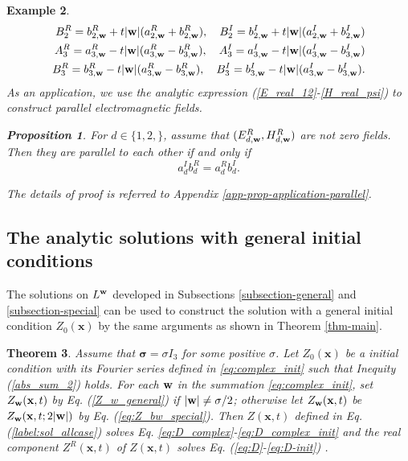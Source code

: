 \documentclass[10pt,reqno]{amsart}
\newcommand{\bS}{\boldsymbol{\sigma}}
\renewcommand{\(}{\left(}
\renewcommand{\)}{\right)}
\newcommand{\bw}{{\bf w}}
\newcommand{\bx}{\mathbf{x}}
\newtheorem{theo}{Theorem}[section]
\newtheorem{prop}[theo]{Proposition}
\newtheorem{ex}[theo]{Example}
\numberwithin{equation}{section}
\begin{document}
\begin{ex}
\begin{eqnarray*}
	B^R_{2} = b^R_{2,\bw} + t|\bw|(a^R_{2,\bw} + b^R_{2,\bw}), \quad B^I_{2} = b^I_{2,\bw} + t|\bw|(a^I_{2,\bw} + b^I_{2,\bw})\\
	A^R_{3} = a^R_{3,\bw} - t|\bw|(a^R_{3,\bw} - b^R_{3,\bw}), \quad A^I_{3} = a^I_{3,\bw} - t|\bw|(a^I_{3,\bw} - b^I_{3,\bw})\\
	B^R_{3} = b^R_{3,\bw} - t|\bw|(a^R_{3,\bw} - b^R_{3,\bw}), \quad B^I_{3} = b^I_{3,\bw} - t|\bw|(a^I_{3,\bw} - b^I_{3,\bw}).
\end{eqnarray*}
As an application,  we use the analytic expression (\ref{E_real_12}-\ref{H_real_psi}) to construct parallel electromagnetic fields.  
\begin{prop}\label{prop:application-parallel}
	For $d\in \{1,2,\}$,  assume that  $(E^R_{d,\bw},  H^R_{d,\bw})$ are not zero fields. Then they are parallel to each other if and only if
	\begin{equation}\label{iff_condition}
		a^I_{d} b^R_{d}= a^R_{d} b^I_{d}.
	\end{equation}
\end{prop}
The details of proof is referred to Appendix \ref{app-prop-application-parallel}.
\end{ex}

\subsection{The analytic solutions  with general initial conditions} \label{subsection-all_together}
The solutions on $L^{\bw}$ developed in Subsections \ref{subsection-general} and \ref{subsection-special} can be used to construct the solution with a general initial condition $Z_0(\bx)$ by the same arguments as shown in Theorem \ref{thm-main}.

\begin{theo}\label{thm-2} Assume that $\bS=\sigma I_3$ for some positive $\sigma$.
Let $Z_0(\bx)$ be a initial condition with its Fourier series defined in \ref{eq:complex_init} such that Inequity (\ref{abs_sum_2}) holds. For each $\bw$ in the summation \ref{eq:complex_init},  set $Z_{\bw}(\bx,t)$ by Eq. (\ref{Z_w_general}) if $|\bw|\neq \sigma/2$; otherwise let $Z_{\bw}(\bx,t)$ be $Z_{\bw}(\bx,t; 2|\bw|)$ by Eq. (\ref{eq:Z_bw_special}).
Then $Z(\bx, t)$ defined in Eq. (\ref{label:sol_allcase}) solves Eq. \ref{eq:D_complex}-\ref{eq:D_complex_init} and the real component $Z^R(\bx, t)$ of $Z(\bx, t)$ solves Eq. (\ref{eq:D}-\ref{eq:D-init}) .
\end{theo}
\end{document}
